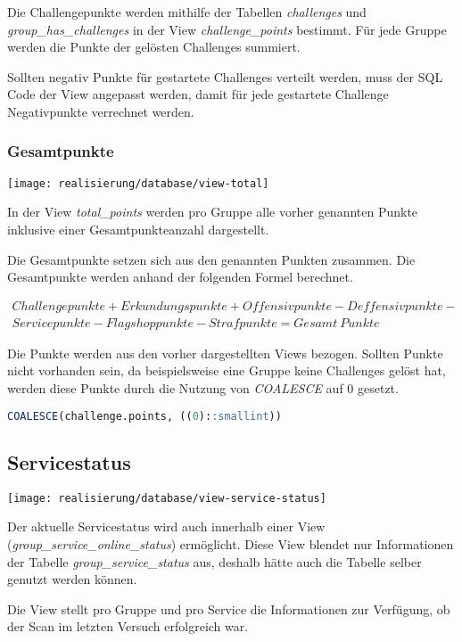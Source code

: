 Die Challengepunkte werden mithilfe der Tabellen \textit{challenges} und \textit{group\_has\_challenges} in der View \textit{challenge\_points} bestimmt. Für jede Gruppe werden die Punkte der gelösten Challenges summiert.

Sollten negativ Punkte für gestartete Challenges verteilt werden, muss der SQL Code der View angepasst werden, damit für jede gestartete Challenge Negativpunkte verrechnet werden. 

\subsubsection{Gesamtpunkte}
\begin{center}
	\texttt{[image: realisierung/database/view-total]}
	\label{fig:realisierung-view-total}
\end{center}

In der View \textit{total\_points} werden pro Gruppe alle vorher genannten Punkte inklusive einer Gesamtpunkteanzahl dargestellt. 

Die Gesamtpunkte setzen sich aus den genannten Punkten zusammen. Die Gesamtpunkte werden anhand der folgenden Formel berechnet.

\begin{multline*}
Challengepunkte + Erkundungspunkte + Offensivpunkte - Deffensivpunkte - \\ Servicepunkte - Flagshoppunkte - Strafpunkte = Gesamt~Punkte
\end{multline*}

Die Punkte werden aus den vorher dargestellten Views bezogen. Sollten Punkte nicht vorhanden sein, da beispielsweise eine Gruppe keine Challenges gelöst hat, werden diese Punkte durch die Nutzung von \textit{COALESCE} auf 0 gesetzt.

\begin{lstlisting}[frame=single, language=sql, caption={SQL Ersetzen nicht vorhandener Daten}, captionpos=b, label={lst:database-total-points-0}]
COALESCE(challenge.points, ((0)::smallint)) 
\end{lstlisting}

\subsection{Servicestatus}
\begin{center}
	\texttt{[image: realisierung/database/view-service-status]}
	\label{fig:realisierung-view-service-status}
\end{center}

Der aktuelle Servicestatus wird auch innerhalb einer View (\textit{group\_service\_online\_status}) ermöglicht. Diese View blendet nur Informationen der Tabelle \textit{group\_service\_status} aus, deshalb hätte auch die Tabelle selber genutzt werden können.

Die View stellt pro Gruppe und pro Service die Informationen zur Verfügung, ob der Scan im letzten Versuch erfolgreich war.